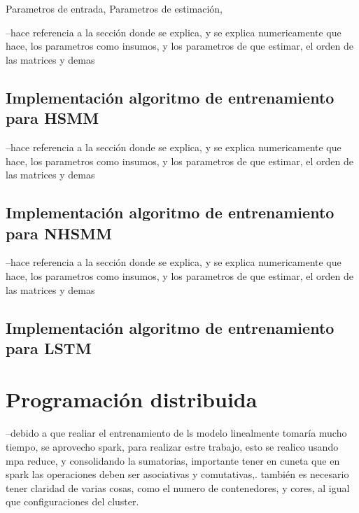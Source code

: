 Parametros de entrada, 
Parametros de estimación, 

--hace referencia a la sección donde se explica, y se explica numericamente que hace, los parametros como insumos, y los parametros de que estimar, el orden de las matrices y demas

\subsection{Implementación algoritmo de entrenamiento para HSMM} %
\label{section4.1.2}

--hace referencia a la sección donde se explica, y se explica numericamente que hace, los parametros como insumos, y los parametros de que estimar, el orden de las matrices y demas

\subsection{Implementación algoritmo de entrenamiento para NHSMM} %
\label{section4.1.3}

--hace referencia a la sección donde se explica, y se explica numericamente que hace, los parametros como insumos, y los parametros de que estimar, el orden de las matrices y demas

\subsection{Implementación algoritmo de entrenamiento para LSTM} %
\label{section4.1.4}

\section{Programación distribuida} %
\label{section4.2}

--debido a que realiar el entrenamiento de ls modelo linealmente tomaría mucho tiempo, se aprovecho spark, para realizar estre trabajo, esto se realico usando mpa reduce, y consolidando la sumatorias, 
importante tener en cuneta que en spark las operaciones deben ser asociativas y comutativas,. 
también es necesario tener claridad de varias cosas, como el numero de contenedores, y cores, al igual que configuraciones del cluster.


